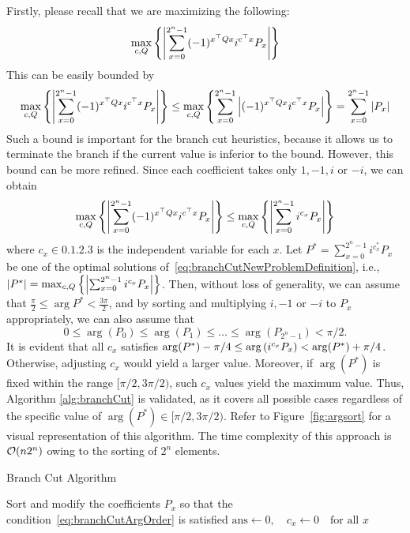 \documentclass[a4paper, onecolumn, 11pt, longbibliography]{quantumarticle}
\begin{document}
Firstly, please recall that we are maximizing the following:
\begin{equation*}
  \max_{c,Q} \qty{ \abs{\sum_{x=0}^{2^n-1} (-1)^{x^\top Q x} i^{c^\top x} P_x} }
\end{equation*}
This can be easily bounded by
\begin{equation*}
  \max_{c,Q} \qty{ \abs{\sum_{x=0}^{2^n-1} (-1)^{x^\top Q x} i^{c^\top x} P_x} }
  \leq \max_{c,Q} \qty{ \sum_{x=0}^{2^n-1} \abs{(-1)^{x^\top Q x} i^{c^\top x} P_x} }
  = \sum_{x=0}^{2^n-1} \abs{P_x}
\end{equation*}
Such a bound is important for the branch cut heuristics,
because it allows us to terminate the branch
if the current value is inferior to the bound.
However, this bound can be more refined.
Since each coefficient takes only
$1, -1, i$ or $-i$, we can obtain
\begin{equation}\label{eq:branchCutNewProblemDefinition}
  \max_{c,Q} \qty{ \abs{\sum_{x=0}^{2^n-1} (-1)^{x^\top Q x} i^{c^\top x} P_x} }
  \leq \max_{c,Q} \qty{ \abs{\sum_{x=0}^{2^n-1} i^{c_x} P_x} }
\end{equation}
where $c_x \in \qty{0, 1, 2, 3}$ is the independent variable for each $x$.
Let $P^* = \sum_{x=0}^{2^n-1} i^{c_x^*} P_x$ be
one of the optimal solutions of~\eqref{eq:branchCutNewProblemDefinition},
i.e., $\abs{P^*} = \max_{c,Q} \qty{ \abs{\sum_{x=0}^{2^n-1} i^{c_x} P_x} }$.
Then, without loss of generality,
we can assume that $\frac{\pi}{2} \leq \arg P^* < \frac{3\pi}{2}$,
and by sorting and multiplying $i,-1$ or $-i$ to $P_x$ appropriately,
we can also assume that
\begin{equation}\label{eq:branchCutArgOrder}
  0 \leq \arg(P_0) \leq \arg(P_1) \leq \dots \leq \arg(P_{2^n-1}) < \pi/2.
\end{equation}
It is evident that all $c_x$ satisfies
$\arg(P^*) - \pi/4 \leq \arg\qty(i^{c_x} P_x) < \arg(P^*) + \pi/4$.
Otherwise, adjusting $c_x$ would yield a larger value.
Moreover, if $\arg(P^*)$ is fixed within the range
$[\pi/2, 3\pi/2)$, such $c_x$ values yield the maximum value.
Thus, Algorithm \ref{alg:branchCut} is validated,
as it covers all possible cases regardless of the specific value
of $\arg(P^*) \in [\pi/2, 3\pi/2)$.
Refer to Figure~\ref{fig:argsort} for a visual representation of this algorithm.
The time complexity of this approach is
$\order{n2^n}$ owing to the sorting of $2^n$ elements.

\begin{algorithm}
  \caption{Branch Cut Algorithm}
  \label{alg:branchCut}
  Sort and modify the coefficients $P_x$ so that the condition~\eqref{eq:branchCutArgOrder} is satisfied\;
  $\mathrm{ans} \leftarrow 0, \quad c_x \leftarrow 0 \quad \text{for all } x$\;
\end{algorithm}
\end{document}
